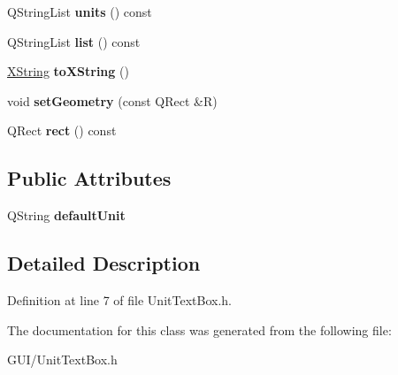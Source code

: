 \begin{DoxyCompactItemize}
Q\+String\+List {\bfseries units} () const
\item 
\mbox{\label{class_unit_text_box_ab28eb4c304dc6b3512cc262c6fa15ed1}} 
Q\+String\+List {\bfseries list} () const
\item 
\mbox{\label{class_unit_text_box_aa1c771cbe1b40771f418ef939b759887}} 
\hyperlink{class_x_string}{X\+String} {\bfseries to\+X\+String} ()
\item 
\mbox{\label{class_unit_text_box_ac2813da799861e2a822cdb8f2d91f09d}} 
void {\bfseries set\+Geometry} (const Q\+Rect \&R)
\item 
\mbox{\label{class_unit_text_box_aa006420484d5bd18ad82a1b15a8dc662}} 
Q\+Rect {\bfseries rect} () const
\end{DoxyCompactItemize}
\subsection*{Public Attributes}
\begin{DoxyCompactItemize}
\item 
\mbox{\label{class_unit_text_box_a511700b5c4f75b21f319d71e272c3b5e}} 
Q\+String {\bfseries default\+Unit}
\end{DoxyCompactItemize}


\subsection{Detailed Description}


Definition at line 7 of file Unit\+Text\+Box.\+h.



The documentation for this class was generated from the following file\+:\begin{DoxyCompactItemize}
\item 
G\+U\+I/Unit\+Text\+Box.\+h\end{DoxyCompactItemize}
